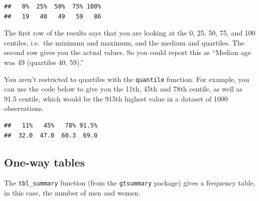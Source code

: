 \documentclass[]{book}
\newenvironment{Shaded}{\begin{snugshade}}{\end{snugshade}}
\newcommand{\CommentTok}[1]{\textcolor[rgb]{0.56,0.35,0.01}{\textit{#1}}}
\newcommand{\DataTypeTok}[1]{\textcolor[rgb]{0.13,0.29,0.53}{#1}}
\newcommand{\FloatTok}[1]{\textcolor[rgb]{0.00,0.00,0.81}{#1}}
\newcommand{\KeywordTok}[1]{\textcolor[rgb]{0.13,0.29,0.53}{\textbf{#1}}}
\newcommand{\NormalTok}[1]{#1}
\newcommand{\OperatorTok}[1]{\textcolor[rgb]{0.81,0.36,0.00}{\textbf{#1}}}
\newcommand{\OtherTok}[1]{\textcolor[rgb]{0.56,0.35,0.01}{#1}}
\newcommand{\StringTok}[1]{\textcolor[rgb]{0.31,0.60,0.02}{#1}}
\begin{document}
\begin{verbatim}
##   0%  25%  50%  75% 100% 
##   19   40   49   59   86
\end{verbatim}

The first row of the results says that you are looking at the 0, 25, 50,
75, and 100 centiles, i.e.~the minimum and maximum, and the medium and
quartiles. The second row gives you the actual values. So you could
report this as ``Median age was 49 (quartiles 40, 59).''

You aren't restricted to quartiles with the \texttt{quantile} function.
For example, you can use the code below to give you the 11th, 45th and
78th centile, as well as 91.5 centile, which would be the 915th highest
value in a dataset of 1000 observations.

\begin{Shaded}
\end{Shaded}

\begin{verbatim}
##   11%   45%   78% 91.5% 
##  32.0  47.0  60.3  69.0
\end{verbatim}

\hypertarget{one-way-tables}{%
\subsection{One-way tables}\label{one-way-tables}}

The \texttt{tbl\_summary} function (from the \texttt{gtsummary} package)
gives a frequency table, in this case, the number of men and women.

\begin{Shaded}
\end{Shaded}
\end{document}
